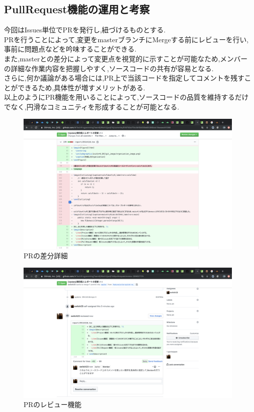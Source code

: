 \documentclass[uplatex,12pt]{jsarticle}
\begin{document}
\newpage


\subsection{PullRequest機能の運用と考察}
今回はIssues単位でPRを発行し,紐づけるものとする. \\
PRを行うことによって,変更をmasterブランチにMergeする前にレビューを行い,事前に問題点などを吟味することができる. \\
また,masterとの差分によって変更点を視覚的に示すことが可能なため,メンバーの詳細な作業内容を把握しやすく,ソースコードの共有が容易となる. \\
さらに,何か議論がある場合には,PR上で当該コードを指定してコメントを残すことができるため,具体性が増すメリットがある. \\
以上のようにPR機能を用いることによって,ソースコードの品質を維持するだけでなく,円滑なコミュニティを形成することが可能となる.

\begin{figure}[!hbt]
  \centering
  \includegraphics[scale=0.20]{git_image/pull_request_detail_image.png}
  \caption{PRの差分詳細}
\end{figure}

\begin{figure}[!hbt]
  \centering
  \includegraphics[scale=0.20]{git_image/pull_request_comment_image.png}
  \caption{PRのレビュー機能}
\end{figure}
\end{document}
